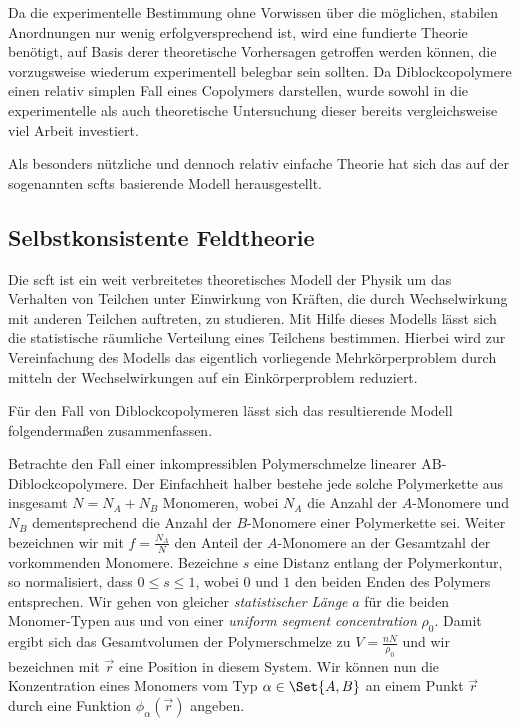 Da die experimentelle Bestimmung ohne Vorwissen über die möglichen, stabilen Anordnungen nur wenig erfolgversprechend ist, wird eine fundierte Theorie benötigt, auf Basis derer theoretische Vorhersagen getroffen werden können, die vorzugsweise wiederum experimentell belegbar sein sollten.
Da Diblockcopolymere einen relativ simplen Fall eines Copolymers darstellen, wurde sowohl in die experimentelle als auch theoretische Untersuchung dieser bereits vergleichsweise viel Arbeit investiert.

Als besonders nützliche und dennoch relativ einfache Theorie hat sich das auf der sogenannten \acp{scft} basierende Modell herausgestellt.

\subsection*{Selbstkonsistente Feldtheorie} %
\label{par:self_consistent_field_theory}

Die \acl{scft} ist ein weit verbreitetes theoretisches Modell der Physik um das Verhalten von Teilchen unter Einwirkung von Kräften, die durch Wechselwirkung mit anderen Teilchen auftreten, zu studieren.
Mit Hilfe dieses Modells lässt sich die statistische räumliche Verteilung eines Teilchens bestimmen.
Hierbei wird zur Vereinfachung des Modells das eigentlich vorliegende Mehrkörperproblem durch mitteln der Wechselwirkungen auf ein Einkörperproblem reduziert.

Für den Fall von Diblockcopolymeren lässt sich das resultierende Modell folgendermaßen zusammenfassen.

Betrachte den Fall einer inkompressiblen Polymerschmelze linearer AB-Diblockcopolymere.
Der Einfachheit halber bestehe jede solche Polymerkette aus insgesamt $N = N_{A} + N_{B}$ Monomeren, wobei $N_{A}$ die Anzahl der $A$-Monomere und $N_{B}$ dementsprechend die Anzahl der $B$-Monomere einer Polymerkette sei.
Weiter bezeichnen wir mit $f = \frac{N_{A}}{N}$ den Anteil der $A$-Monomere an der Gesamtzahl der vorkommenden Monomere.
Bezeichne $s$ eine Distanz entlang der Polymerkontur, so normalisiert, dass $0 \leq s \leq 1$, wobei $0$ und $1$ den beiden Enden des Polymers entsprechen.
Wir gehen von gleicher \emph{statistischer Länge} $a$ für die beiden Monomer-Typen aus und von einer \emph{uniform segment concentration} $\rho_{0}$.
Damit ergibt sich das Gesamtvolumen der Polymerschmelze zu $V = \frac{nN}{\rho_{0}}$ und wir bezeichnen mit $\vec{r}$ eine Position in diesem System.
Wir können nun die Konzentration eines Monomers vom Typ $\alpha \in \Set{A, B}$ an einem Punkt $\vec{r}$ durch eine Funktion $\phi_{\alpha}(\vec{r})$ angeben.


